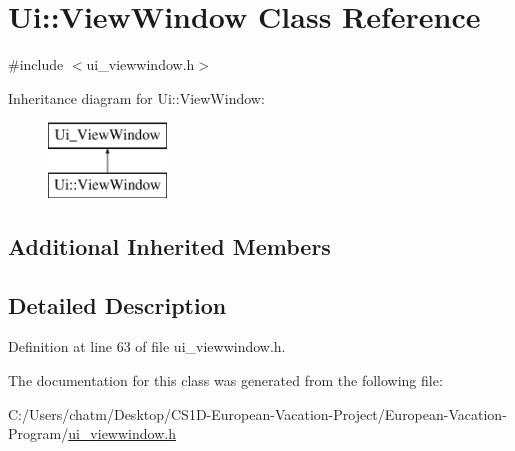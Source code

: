 \hypertarget{class_ui_1_1_view_window}{}\section{Ui\+::View\+Window Class Reference}
\label{class_ui_1_1_view_window}


{\ttfamily \#include $<$ui\+\_\+viewwindow.\+h$>$}

Inheritance diagram for Ui\+::View\+Window\+:\begin{figure}[H]
\begin{center}
\leavevmode
\includegraphics[height=2.000000cm]{class_ui_1_1_view_window}
\end{center}
\end{figure}
\subsection*{Additional Inherited Members}


\subsection{Detailed Description}


Definition at line 63 of file ui\+\_\+viewwindow.\+h.



The documentation for this class was generated from the following file\+:\begin{DoxyCompactItemize}
\item 
C\+:/\+Users/chatm/\+Desktop/\+C\+S1\+D-\/\+European-\/\+Vacation-\/\+Project/\+European-\/\+Vacation-\/\+Program/\mbox{\hyperlink{ui__viewwindow_8h}{ui\+\_\+viewwindow.\+h}}\end{DoxyCompactItemize}

